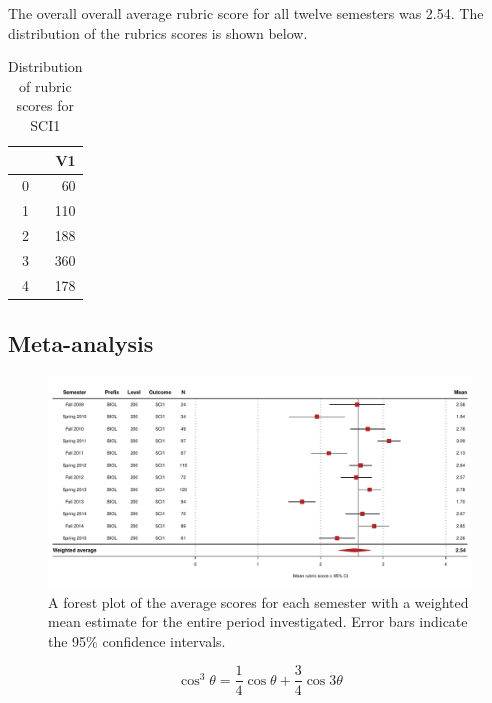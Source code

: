\documentclass[fleqn,10pt]{SelfArx}\usepackage[]{graphicx}\usepackage[]{color}
\begin{document}
The overall overall average rubric score for all twelve semesters was 2.54. The distribution of the rubrics scores is shown below.
\begin{center}
\begin{table}[ht]
\centering
\caption{Distribution of rubric scores for SCI1} 
\label{tab:distribution}
\begin{tabular}{rr}
  \hline
 & V1 \\ 
  \hline
0 &  60 \\ 
  1 & 110 \\ 
  2 & 188 \\ 
  3 & 360 \\ 
  4 & 178 \\ 
   \hline
\end{tabular}
\end{table}

\end{center}

\lipsum[1]
\subsection{Meta-analysis}
\begin{figure}[ht]\centering %

\includegraphics[width=\textwidth]{./figure/forest}
\protect\caption{A forest plot of the average scores for each semester with a weighted mean estimate for the entire period investigated. Error bars indicate the 95\% confidence intervals.}
\label{fig:forest.pdf}
\end{figure}

\lipsum[1] %
\lipsum[1]

\begin{equation}
\cos^3 \theta =\frac{1}{4}\cos\theta+\frac{3}{4}\cos 3\theta
\label{eq:refname2}
\end{equation}
\end{document}

